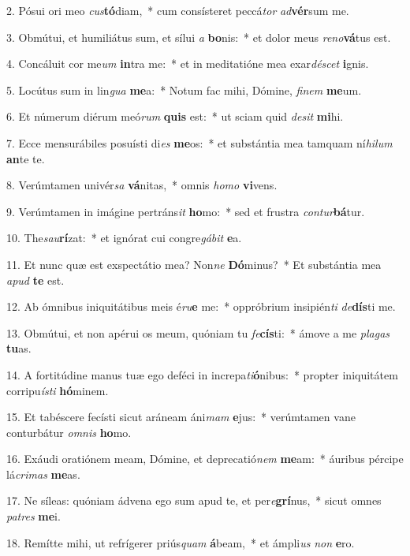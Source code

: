 2. Pósui ori meo \textit{cus}\textbf{tó}diam,~*  cum consísteret peccá\textit{tor} \textit{ad}\textbf{vér}sum me.\

3. Obmútui, et humiliátus sum, et sílui \textit{a} \textbf{bo}nis:~*  et dolor meus \textit{re}\textit{no}\textbf{vá}tus est.\

4. Concáluit cor me\textit{um} \textbf{in}tra me:~*  et in meditatióne mea exar\textit{dé}\textit{scet} \textbf{i}gnis.\

5. Locútus sum in lin\textit{gua} \textbf{me}a:~*  Notum fac mihi, Dómine, \textit{fi}\textit{nem} \textbf{me}um.\

6. Et númerum diérum meó\textit{rum} \textbf{quis} est:~*  ut sciam quid \textit{de}\textit{sit} \textbf{mi}hi.\

7. Ecce mensurábiles posuísti di\textit{es} \textbf{me}os:~*  et substántia mea tamquam ní\textit{hi}\textit{lum} \textbf{an}te te.\

8. Verúmtamen univér\textit{sa} \textbf{vá}nitas,~*  omnis \textit{ho}\textit{mo} \textbf{vi}vens.\

9. Verúmtamen in imágine pertráns\textit{it} \textbf{ho}mo:~*  sed et frustra \textit{con}\textit{tur}\textbf{bá}tur.\

10. The\textit{sau}\textbf{rí}zat:~*  et ignórat cui congre\textit{gá}\textit{bit} \textbf{e}a.\

11. Et nunc quæ est exspectátio mea? Non\textit{ne} \textbf{Dó}minus?~*  Et substántia mea \textit{a}\textit{pud} \textbf{te} est.\

12. Ab ómnibus iniquitátibus meis é\textit{ru}\textbf{e} me:~*  oppróbrium insipién\textit{ti} \textit{de}\textbf{dís}ti me.\

13. Obmútui, et non apérui os meum, quóniam tu \textit{fe}\textbf{cís}ti:~*  ámove a me \textit{pla}\textit{gas} \textbf{tu}as.\

14. A fortitúdine manus tuæ ego deféci in increpa\textit{ti}\textbf{ó}nibus:~*  propter iniquitátem corripu\textit{ís}\textit{ti} \textbf{hó}minem.\

15. Et tabéscere fecísti sicut aráneam áni\textit{mam} \textbf{e}jus:~*  verúmtamen vane conturbátur \textit{om}\textit{nis} \textbf{ho}mo.\

16. Exáudi oratiónem meam, Dómine, et deprecatió\textit{nem} \textbf{me}am:~*  áuribus pércipe lá\textit{cri}\textit{mas} \textbf{me}as.\

17. Ne síleas: quóniam ádvena ego sum apud te, et per\textit{e}\textbf{grí}nus,~*  sicut omnes \textit{pa}\textit{tres} \textbf{me}i.\

18. Remítte mihi, ut refrígerer priús\textit{quam} \textbf{á}beam,~*  et ámpli\textit{us} \textit{non} \textbf{e}ro.\

